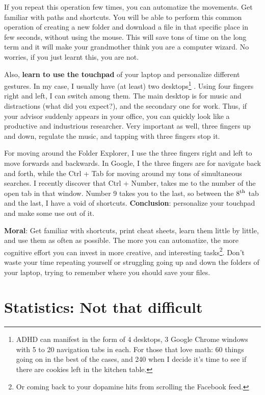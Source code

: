 \documentclass{article}
\begin{document}
If you repeat this operation few times, you can automatize the movements. Get familiar with paths and shortcuts. You will be able to perform this common operation of creating a new folder and download a file in that specific place in few seconds, without using the mouse. This will save tons of time on the long term and it will make your grandmother think you are a computer wizard. No worries, if you just learnt this, you are not.

Also, \textbf{learn to use the touchpad} of your laptop and personalize different gestures. In my case, I usually have (at least) two desktops\footnote{ADHD can manifest in the form of 4 desktops, 3 Google Chrome windows with 5 to 20 navigation tabs in each. For those that love math: 60 things going on in the best of the cases, and 240 when I decide it’s time to see if there are cookies left in the kitchen table.} . Using four fingers right and left, I can switch among them. The main desktop is for music and distractions (what did you expect?), and the secondary one for work. Thus, if your advisor suddenly appears in your office, you can quickly look like a productive and industrious researcher. Very important as well, three fingers up and down, regulate the music, and tapping with three fingers stop it. 

For moving around the Folder Explorer, I use the three fingers right and left to move forwards and backwards. In Google, I the three fingers are for navigate back and forth, while the Ctrl + Tab %
for moving around my tons of simultaneous searches. I recently discover that Ctrl + Number, takes me to the number of the open tab in that window. Number 9 takes you to the last, so between the 8$^{\textnormal{th}}$ tab and the last, I have a void of shortcuts. \textbf{Conclusion}: personalize your touchpad and make some use out of it. 

\textbf{Moral}: Get familiar with shortcuts, print cheat sheets, learn them little by little, and use them as often as possible. The more you can automatize, the more cognitive effort you can invest in more creative, and interesting tasks\footnote{Or coming back to your dopamine hits from scrolling the Facebook feed.}. Don’t waste your time repeating yourself or struggling going up and down the folders of your laptop, trying to remember where you should save your files. 

\section{Statistics: Not that difficult}
\label{sec: Statis}
\end{document}
